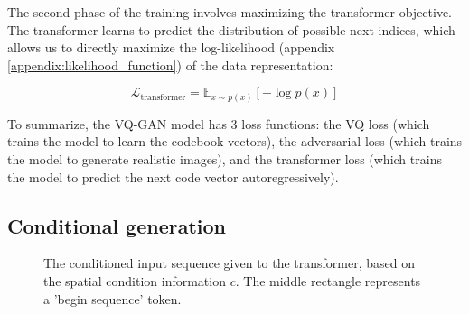 
The second phase of the training involves maximizing the transformer objective. The transformer learns to predict the distribution of possible next indices, which allows us to directly maximize the log-likelihood (appendix \ref{appendix:likelihood_function}) of the data representation:

\begin{equation}
    \mathcal{L}_{\text{transformer}} = \mathbb{E}_{x \sim p(x)} [- \log p(x)]
\end{equation}

To summarize, the VQ-GAN model has 3 loss functions: the VQ loss (which trains the model to learn the codebook vectors), the adversarial loss (which trains the model to generate realistic images), and the transformer loss (which trains the model to predict the next code vector autoregressively).







\subsection{Conditional generation}

\begin{figure}
    \centering
    \caption{The conditioned input sequence given to the transformer, based on the spatial condition information $c$. The middle rectangle represents a 'begin sequence' token.}
    \label{fig:vqgan_conditional_generation}
\end{figure}

